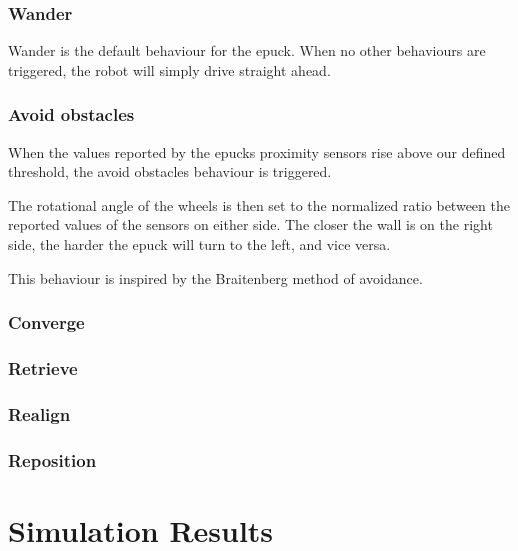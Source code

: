 \documentclass{article}
\begin{document}
\subsubsection{Wander}
Wander is the default behaviour for the epuck. When no other behaviours are triggered, the robot will simply drive straight ahead.

\subsubsection{Avoid obstacles}
When the values reported by the epucks proximity sensors rise above our defined threshold, the avoid obstacles behaviour is triggered.

The rotational angle of the wheels is then set to the normalized ratio between the reported values of the sensors on either side. The closer the wall is on the right side, the harder the epuck will turn to the left, and vice versa. 

This behaviour is inspired by the Braitenberg method of avoidance.
 
\subsubsection{Converge}


\subsubsection{Retrieve}

\subsubsection{Realign}

\subsubsection{Reposition}

\section{Simulation Results}
\end{document}
